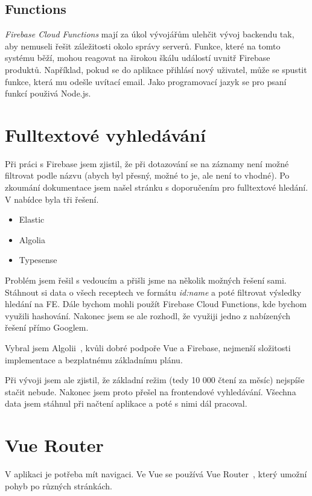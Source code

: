 \subsection{Functions}
\emph{Firebase Cloud Functions} mají za úkol vývojářům ulehčit vývoj backendu tak, aby nemuseli řešit záležitosti okolo správy serverů.
Funkce, které na tomto systému běží, mohou reagovat na širokou škálu událostí uvnitř Firebase produktů. Například, pokud se do aplikace
přihlásí nový uživatel, může se spustit funkce, která mu odešle uvítací email. Jako programovací jazyk se pro psaní funkcí použivá Node.js.~\cite{FirebaseFunctions}

\section{Fulltextové vyhledávání}
Při práci s Firebase jsem zjistil, že při dotazování se na záznamy není možné filtrovat podle názvu
(abych byl přesný, možné to je, ale není to vhodné). Po zkoumání dokumentace jsem našel stránku s doporučením pro
fulltextové hledání. V nabídce byla tři řešení.~\cite{FulltextSearch}

\begin{itemize}
    \item Elastic
    \item Algolia
    \item Typesense
\end{itemize}

Problém jsem řešil s vedoucím a přišli jsme na několik možných řešení sami. Stáhnout si data o všech receptech ve formátu
\emph{id:name} a poté filtrovat výsledky hledání na FE. Dále bychom mohli použít Firebase Cloud Functions, kde bychom
využili hashování. Nakonec jsem se ale rozhodl, že využiji jedno z nabízených řešení přímo Googlem.

Vybral jsem Algolii~\cite{Algolia}, kvůli dobré podpoře Vue a Firebase, nejmenší složitosti implementace a bezplatnému základnímu plánu.

Při vývoji jsem ale zjistil, že základní režim (tedy 10 000 čtení za měsíc) nejspíše stačit nebude. Nakonec jsem proto přešel na
frontendové vyhledávání. Všechna data jsem stáhnul při načtení aplikace a poté s nimi dál pracoval.

\section{Vue Router} %
V aplikaci je potřeba mít navigaci. Ve Vue se používá Vue Router~\cite{VueRouter}, který umožní pohyb po různých stránkách.

